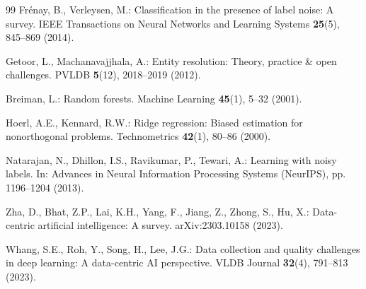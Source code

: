 \documentclass[runningheads]{llncs}
\begin{document}
\begin{thebibliography}{99}
Frénay, B., Verleysen, M.:
Classification in the presence of label noise: A survey.
IEEE Transactions on Neural Networks and Learning Systems
\textbf{25}(5), 845--869 (2014).

Getoor, L., Machanavajjhala, A.:
Entity resolution: Theory, practice \& open challenges.
PVLDB \textbf{5}(12), 2018--2019 (2012).

Breiman, L.:
Random forests.
Machine Learning \textbf{45}(1), 5--32 (2001).

Hoerl, A.E., Kennard, R.W.:
Ridge regression: Biased estimation for nonorthogonal problems.
Technometrics \textbf{42}(1), 80--86 (2000).

Natarajan, N., Dhillon, I.S., Ravikumar, P., Tewari, A.:
Learning with noisy labels.
In: Advances in Neural Information Processing Systems
(NeurIPS), pp. 1196--1204 (2013).

Zha, D., Bhat, Z.P., Lai, K.H., Yang, F., Jiang, Z., Zhong, S.,
Hu, X.:
Data-centric artificial intelligence: A survey.
arXiv:2303.10158 (2023).

Whang, S.E., Roh, Y., Song, H., Lee, J.G.:
Data collection and quality challenges in deep learning:
A data-centric AI perspective.
VLDB Journal \textbf{32}(4), 791--813 (2023).

\end{thebibliography}
\end{document}
